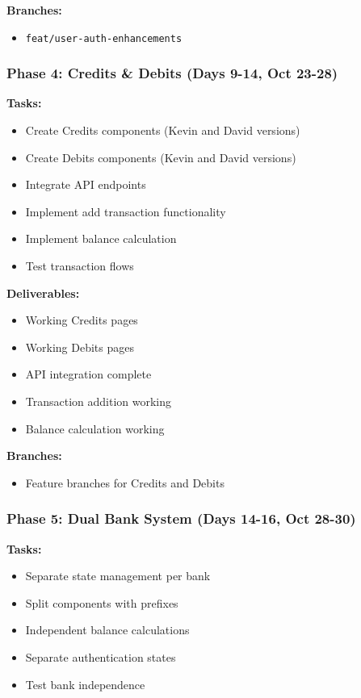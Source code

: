 \documentclass[11pt,a4paper]{article}
\begin{document}
\textbf{Branches:}
\begin{itemize}[leftmargin=*]
    \item \texttt{feat/user-auth-enhancements}
\end{itemize}

\subsubsection{Phase 4: Credits \& Debits (Days 9-14, Oct 23-28)}
\textbf{Tasks:}
\begin{itemize}[leftmargin=*]
    \item Create Credits components (Kevin and David versions)
    \item Create Debits components (Kevin and David versions)
    \item Integrate API endpoints
    \item Implement add transaction functionality
    \item Implement balance calculation
    \item Test transaction flows
\end{itemize}

\textbf{Deliverables:}
\begin{itemize}[leftmargin=*]
    \item Working Credits pages
    \item Working Debits pages
    \item API integration complete
    \item Transaction addition working
    \item Balance calculation working
\end{itemize}

\textbf{Branches:}
\begin{itemize}[leftmargin=*]
    \item Feature branches for Credits and Debits
\end{itemize}

\subsubsection{Phase 5: Dual Bank System (Days 14-16, Oct 28-30)}
\textbf{Tasks:}
\begin{itemize}[leftmargin=*]
    \item Separate state management per bank
    \item Split components with prefixes
    \item Independent balance calculations
    \item Separate authentication states
    \item Test bank independence
\end{itemize}
\end{document}
